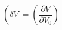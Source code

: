 \begin{equation}
\label{eq:deltaV}
\left(\delta V\ = \left( \frac{\partial{V}}{\partial{V_0}}\right)
\end{equation}